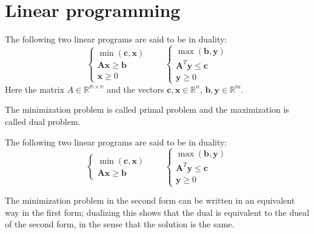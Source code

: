 \section{Linear programming}

\begin{definition}
    The following two linear programs are said to be in duality: 
    \[\begin{cases}
        \min(\mathbf{c},\mathbf{x}) \\
        \mathbf{Ax} \geq \mathbf{b} \\
        \mathbf{x} \geq 0
    \end{cases} \qquad \begin{cases}
        \max(\mathbf{b},\mathbf{y}) \\
        \mathbf{A}^T\mathbf{y} \leq \mathbf{c} \\
        \mathbf{y} \geq 0
    \end{cases}\]
    Here the matrix $A\in\mathbb{R^{m\times n}}$ and the vectors $\mathbf{c},\mathbf{x}\in\mathbb{R}^n$, $\mathbf{b},\mathbf{y}\in\mathbb{R}^m$.
\end{definition}
The minimization problem is called primal problem and the maximization is called dual problem. 
\begin{definition}
    The following two linear programs are said to be in duality: 
    \[\begin{cases}
        \min(\mathbf{c},\mathbf{x}) \\
        \mathbf{Ax} \geq \mathbf{b} 
    \end{cases} \qquad \begin{cases}
        \max(\mathbf{b},\mathbf{y}) \\
        \mathbf{A}^T\mathbf{y} \leq \mathbf{c} \\
        \mathbf{y} \geq 0
    \end{cases}\]
\end{definition}
The minimization problem in the second form can be written in an equivalent way in the first form; dualizing this shows that the dual is equivalent to the dueal of the second form, in the sense that the solution is the same. 

